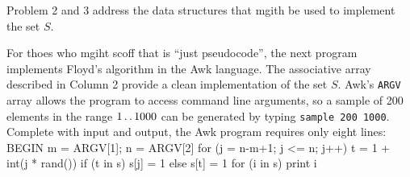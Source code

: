 \bye

Problem 2 and 3 address the data structures that mgith be used to implement the
set $S$.

For thoes who mgiht scoff that  is ``just pseudocode'', the next program
implements Floyd's algorithm in the Awk language. The associative array described
in Column 2 provide a clean implementation of the set $S$. Awk's {\tt ARGV} array
allows the program to access command line arguments, so a sample of 200 elements
in the range $1\mathinner{\ldotp\ldotp}1000$ can be generated by typing {\tt sample 200 1000}.
Complete with input and output, the Awk program requires only eight lines:
\begintt
BEGIN { m = ARGV[1]; n = ARGV[2]
        for (j = n-m+1; j <= n; j++) {
            t = 1 + int(j * rand())
            if (t in s) s[j] = 1
            else s[t] = 1
        }
        for (i in s) print i
}
\endtt


